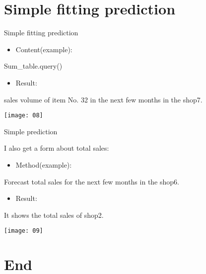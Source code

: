 \documentclass[
 size=12pt,
 paper=smartboard, %
 mode=present, %
 display=slides, %
style=tuliplab,
pauseslide,
fleqn,leqno]{powerdot}
\begin{document}
\section{Simple fitting prediction}

\begin{slide}{Simple fitting prediction}
\begin{itemize}
\item Content(example):
\end{itemize}
\center Sum_table.query()
\begin{itemize}
\item Result:
\end{itemize}
 sales volume of item No. 32 in the next few months in the shop7.\par
\texttt{[image: 08]}
\end{slide}

\begin{slide}{Simple  prediction}

I also get a form about total sales:

\begin{itemize}
\item Method(example):
\end{itemize}

\center   Forecast total sales for the next few months in the shop6.\par

\begin{itemize}
\item Result:
\end{itemize}

It shows the total sales of shop2. \par

\texttt{[image: 09]}

\end{slide}

\section{End}
\end{document}
